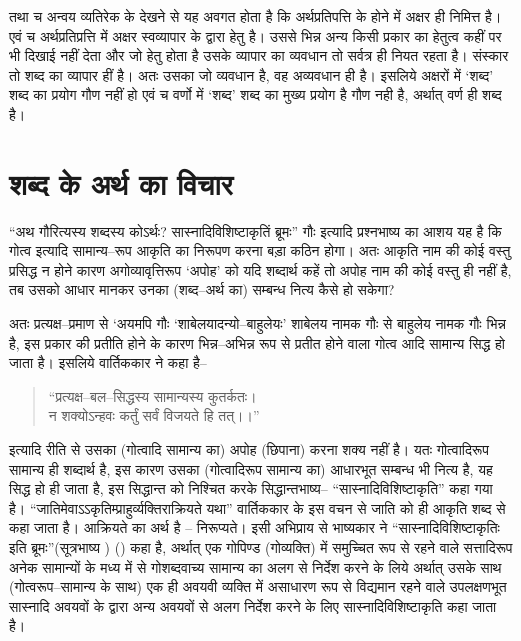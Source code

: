 तथा च अन्वय व्यतिरेक के देखने से यह अवगत होता है कि अर्थप्रतिपत्ति के होने में अक्षर ही निमित्त है। एवं च अर्थप्रतिप्रत्ति में अक्षर स्वव्यापार के द्वारा हेतु है। उससे भिन्न अन्य किसी प्रकार का हेतुत्व कहीं पर भी दिखाई नहीं देता और जो हेतु होता है उसके व्यापार का व्यवधान तो सर्वत्र ही नियत रहता है। संस्कार तो शब्द का व्यापार हीं है। अतः उसका जो व्यवधान है, वह अव्यवधान ही है। इसलिये अक्षरों में ‘शब्द' शब्द का प्रयोग गौण नहीं हो एवं च वर्णो में ‘शब्द' शब्द का मुख्य प्रयोग है गौण नही है, अर्थात् वर्ण ही शब्द है।


\section*{शब्द के अर्थ का विचार}

“अथ गौरित्यस्य शब्दस्य कोऽर्थः? सास्नादिविशिष्टाकृतिं ब्रूमः” गौः इत्यादि प्रश्नभाष्य का आशय यह है कि गोत्व इत्यादि सामान्य–रूप आकृति का निरूपण करना बड़ा कठिन होगा। अतः आकृति नाम की कोई वस्तु प्रसिद्ध न होने कारण अगोव्यावृत्तिरूप ‘अपोह' को यदि शब्दार्थ कहें तो अपोह नाम की कोई वस्तु ही नहीं है, तब उसको आधार मानकर उनका (शब्द–अर्थ का) सम्बन्ध नित्य कैसे हो सकेगा?

अतः प्रत्यक्ष–प्रमाण से ‘अयमपि गौः ‘शाबेलयादन्यो–बाहुलेयः' शाबेलय नामक गौः से बाहुलेय नामक गौः भिन्न है, इस प्रकार की प्रतीति होने के कारण भिन्न–अभिन्न रूप से प्रतीत होने वाला गोत्व आदि सामान्य सिद्ध हो जाता है। इसलिये वार्तिककार ने कहा है–

\begin{verse}
“प्रत्यक्ष–बल–सिद्धस्य सामान्यस्य कुतर्कतः।\\ न शक्योऽन्हवः कर्तुं सर्वं विजयते हि तत्।।”
\end{verse}

इत्यादि रीति से उसका (गोत्वादि सामान्य का) अपोह (छिपाना) करना शक्य नहीं है। यतः गोत्वादिरूप सामान्य ही शब्दार्थ है, इस कारण उसका (गोत्वादिरूप सामान्य का) आधारभूत सम्बन्ध भी नित्य है, यह सिद्ध हो ही जाता है, इस सिद्धान्त को निश्चित करके सिद्धान्तभाष्य– “सास्नादिविशिष्टाकृति” कहा गया है। “जातिमेवाऽऽकृतिम्प्राहुर्व्यक्तिराक्रियते यथा” वार्तिककार के इस वचन से जाति को ही आकृति शब्द से कहा जाता है। आक्रियते का अर्थ है – निरूप्यते। इसी अभिप्राय से भाष्यकार ने “सास्नादिविशिष्टाकृतिः इति ब्रूमः”(सूत्रभाष्य ) () कहा है, अर्थात् एक गोपिण्ड (गोव्यक्ति) में समुच्चित रूप से रहने वाले सत्तादिरूप अनेक सामान्यों के मध्य में से गोशब्दवाच्य सामान्य का अलग से निर्देश करने के लिये अर्थात् उसके साथ (गोत्वरूप–सामान्य के साथ) एक ही अवयवी व्यक्ति में असाधारण रूप से विद्यमान रहने वाले उपलक्षणभूत सास्नादि अवयवों के द्वारा अन्य अवयवों से अलग निर्देश करने के लिए सास्नादिविशिष्टाकृति कहा जाता है।


